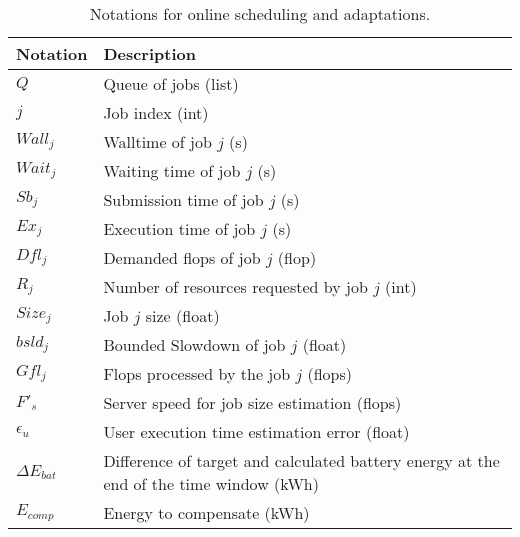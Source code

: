 \begin{table*}[!htb]
\centering
\caption{Notations for online scheduling and adaptations.}
\label{tab:notation_job}
\begin{tabular}{l|p{12cm}}
    \hline
    Notation & Description \\\hline\hline
    $Q$ & Queue of jobs (list)\\
    $j$ & Job index (int)\\
    $Wall_j$ & Walltime of job $j$ (s)\\
    $Wait_j$ & Waiting time of job $j$ (s)\\
    $Sb_j$ & Submission time of job $j$ (s)\\
    $Ex_j$ & Execution time of job $j$ (s)\\
    $Dfl_j$ & Demanded flops of job $j$ (flop)\\
    $R_j$ & Number of resources requested by job $j$ (int) \\
    $Size_j$ & Job $j$ size (float)\\
    $bsld_j$ & Bounded Slowdown of job $j$ (float)\\
    $Gfl_j$ & Flops processed by the job $j$ (flops)\\
    $F'_{s}$ & Server speed for job size estimation (flops)\\
    $\epsilon_{u}$ & User execution time estimation error (float)\\
    $\Delta E_{bat}$ & Difference of target and calculated battery energy at the end of the time window (kWh)\\
    $E_{comp}$ & Energy to compensate (kWh)\\
    \hline
\end{tabular}
\end{table*}